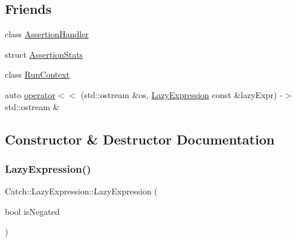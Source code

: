 \subsection*{Friends}
\begin{DoxyCompactItemize}
\item 
class \mbox{\hyperlink{class_catch_1_1_lazy_expression_a4301a3aa57b612dd8b6ef8461742ecab}{Assertion\+Handler}}
\item 
struct \mbox{\hyperlink{class_catch_1_1_lazy_expression_a64019eb137f5ce447cdc71cb80b6e7a4}{Assertion\+Stats}}
\item 
class \mbox{\hyperlink{class_catch_1_1_lazy_expression_af3aa096bb29a772bc534830f29a2ce7a}{Run\+Context}}
\item 
auto \mbox{\hyperlink{class_catch_1_1_lazy_expression_aa01086581cab2fcd2d4580b8fa787dfc}{operator$<$$<$}} (std\+::ostream \&os, \mbox{\hyperlink{class_catch_1_1_lazy_expression}{Lazy\+Expression}} const \&lazy\+Expr) -\/$>$ std\+::ostream \&
\end{DoxyCompactItemize}


\subsection{Constructor \& Destructor Documentation}
\mbox{\label{class_catch_1_1_lazy_expression_a47186c2487bd4bf871e870ba8048553a}} 
\subsubsection{\texorpdfstring{LazyExpression()}{LazyExpression()}\hspace{0.1cm}{\footnotesize\ttfamily [1/2]}}
{\footnotesize\ttfamily Catch\+::\+Lazy\+Expression\+::\+Lazy\+Expression (\begin{DoxyParamCaption}\item[{bool}]{is\+Negated }\end{DoxyParamCaption})}

\mbox{\label{class_catch_1_1_lazy_expression_ab82d5e94df0e159b018fbde0170e46f8}} 
